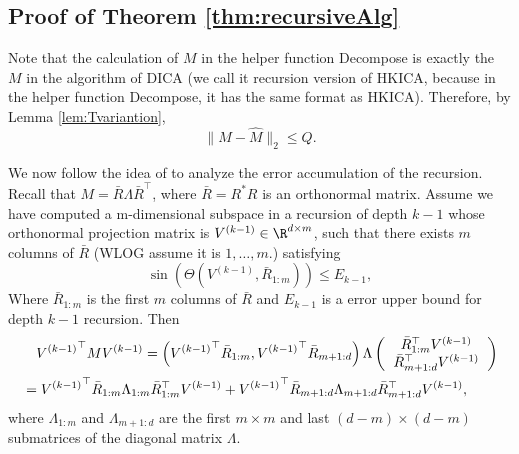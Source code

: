 \subsection{Proof of Theorem \ref{thm:recursiveAlg}}
Note that the calculation of $M$ in the helper function Decompose is exactly the $M$ in the algorithm of DICA (we call it recursion version of HKICA, because in the helper function  Decompose, it has the same format as HKICA).
Therefore, by Lemma \ref{lem:Tvariantion},
\[
\|M-\hat{M}\|_2 \le Q.
\]

We now follow the idea of \citet{vempala2014max} to analyze the error accumulation of the recursion.
Recall that $M = \bar{R}\Lambda\bar{R}^{\top}$, where $\bar{R} = R^*R$ is an orthonormal matrix.
Assume we have computed a m-dimensional subspace in a recursion of depth $k-1$ whose orthonormal projection matrix is $V^{(k-1)} \in \R^{d\times m}$, such that there exists $m$ columns of $\bar{R}$ (WLOG assume it is $1,\ldots,m$.) satisfying
\[
\sin\left(\Theta\left(V^{(k-1)}, \bar{R}_{1:m}\right)\right) \le E_{k-1},
\] 
Where $\bar{R}_{1:m}$ is the first $m$ columns of $\bar{R}$ and $E_{k-1}$ is a error upper bound for depth $k-1$ recursion.
Then
\begin{align*}
& \quad {V^{(k-1)}}^\top MV^{(k-1)} = \left( {V^{(k-1)}}^\top\bar{R}_{1:m}, {V^{(k-1)}}^\top\bar{R}_{m+1:d}\right)\Lambda
\left(
\begin{tabular}{c}
$\bar{R}_{1:m}^{\top} V^{(k-1)}$ \\
$\bar{R}_{m+1:d}^{\top} V^{(k-1)}$
\end{tabular}
\right) \\
& = {V^{(k-1)}}^\top\bar{R}_{1:m}\Lambda_{1:m} \bar{R}_{1:m}^{\top} V^{(k-1)} + {V^{(k-1)}}^\top\bar{R}_{m+1:d}\Lambda_{m+1:d}\bar{R}_{m+1:d}^{\top} V^{(k-1)},
\end{align*}
where $\Lambda_{1:m}$ and $\Lambda_{m+1:d}$ are the first $m\times m$  and last $(d-m)\times (d-m)$ submatrices of the diagonal matrix $\Lambda$.

